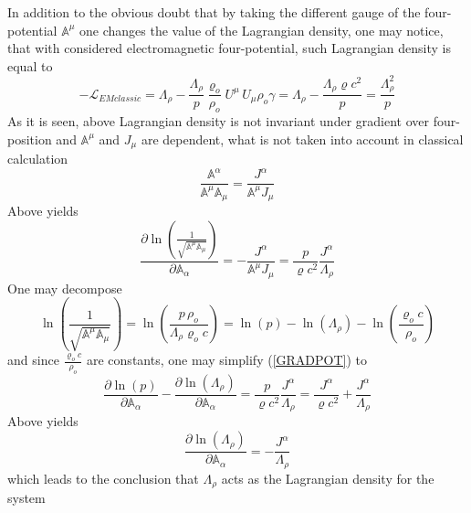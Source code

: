 \documentclass[aps,prx,preprint,groupedaddress,showkeys]{revtex4-2}
\begin{document}
In addition to the obvious doubt that by taking the different gauge of the four-potential $\mathbb{A}^{\mu}$ one changes the value of the Lagrangian density, one may notice, that with considered electromagnetic four-potential, such Lagrangian density is equal to
\begin{equation} \label{CLASSLAG2}
- \mathcal{L}_{EMclassic} = \Lambda_{\rho} - \frac{\Lambda_{\rho}}{p} \frac{\varrho_o}{\rho_o} U^{\mu} \, U_{\mu} \rho_o \gamma = \Lambda_{\rho} - \frac{\Lambda_{\rho} \varrho c^2}{p} = \frac{\Lambda_{\rho}^2}{p}
\end{equation}
As it is seen, above Lagrangian density is not invariant under gradient over four-position and $\mathbb{A}^{\mu}$ and $J_{\mu}$ are dependent, what is not taken into account in classical calculation
\begin{equation} \label{DEPENDFIELDS}
\frac{\mathbb{A}^{\alpha}}{\mathbb{A}^{\mu} \mathbb{A}_{\mu}}  = \frac{J^{\alpha}}{\mathbb{A}^{\mu} J_{\mu}} 
\end{equation}
Above yields 
\begin{equation} \label{GRADPOT}
\frac{\partial \ln{\left ( \frac{1}{\sqrt{\mathbb{A}^{\mu} \mathbb{A}_{\mu}}} \right)}}{\partial \mathbb{A}_{\alpha}} = - \frac{J^{\alpha}}{\mathbb{A}^{\mu} J_{\mu}} = \frac{p}{\varrho c^2} \frac{J^{\alpha}}{\Lambda_{\rho}}
\end{equation}
One may decompose
\begin{equation} \label{DECPOT}
\ln{\left ( \frac{1}{\sqrt{\mathbb{A}^{\mu} \mathbb{A}_{\mu}}} \right)} = \ln{\left ( \frac{p \, \rho_o }{\Lambda_{\rho} \varrho_o c} \right)} = \ln{\left (p \right ) } - \ln{\left (\Lambda_{\rho} \right ) } - \ln{\left ( \frac{\varrho_o c}{\rho_o }\right ) } 
\end{equation}
and since $\frac{\varrho_o c}{\rho_o }$ are constants, one may simplify (\ref{GRADPOT}) to
\begin{equation} \label{GRAFIN}
\frac{\partial \ln{\left ( p \right)} }{\partial \mathbb{A}_{\alpha}} - \frac{\partial \ln{\left (\Lambda_{\rho} \right ) } }{\partial \mathbb{A}_{\alpha}} = \frac{p}{\varrho c^2} \frac{J^{\alpha}}{\Lambda_{\rho}} = \frac{J^{\alpha}}{\varrho c^2} + \frac{J^{\alpha}}{\Lambda_{\rho}}
\end{equation}
Above yields
\begin{equation} \label{MUINV}
\frac{\partial \ln{\left ( \Lambda_{\rho} \right ) }}{\partial \mathbb{A}_{\alpha}} = - \frac{J^{\alpha}}{\Lambda_{\rho}}
\end{equation}
which leads to the conclusion that $\Lambda_{\rho}$ acts as the Lagrangian density for the system
\end{document}
